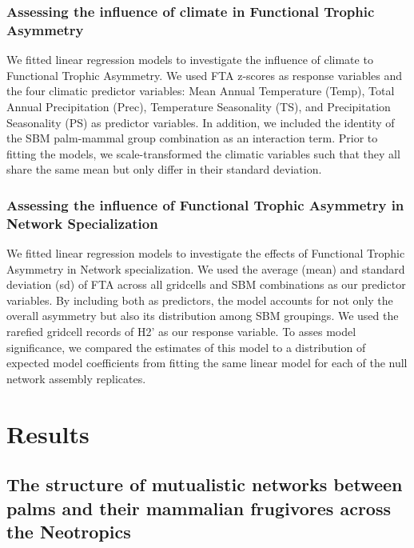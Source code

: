 \documentclass[
]{agujournal2019}
\begin{document}
\subsubsection{Assessing the influence of climate in Functional Trophic
Asymmetry}\label{assessing-the-influence-of-climate-in-functional-trophic-asymmetry}

We fitted linear regression models to investigate the influence of
climate to Functional Trophic Asymmetry. We used FTA z-scores as
response variables and the four climatic predictor variables: Mean
Annual Temperature (Temp), Total Annual Precipitation (Prec),
Temperature Seasonality (TS), and Precipitation Seasonality (PS) as
predictor variables. In addition, we included the identity of the SBM
palm-mammal group combination as an interaction term. Prior to fitting
the models, we scale-transformed the climatic variables such that they
all share the same mean but only differ in their standard deviation.

\subsubsection{Assessing the influence of Functional Trophic Asymmetry
in Network
Specialization}\label{assessing-the-influence-of-functional-trophic-asymmetry-in-network-specialization}

We fitted linear regression models to investigate the effects of
Functional Trophic Asymmetry in Network specialization. We used the
average (mean) and standard deviation (sd) of FTA across all gridcells
and SBM combinations as our predictor variables. By including both as
predictors, the model accounts for not only the overall asymmetry but
also its distribution among SBM groupings. We used the rarefied gridcell
records of H2' as our response variable. To asses model significance, we
compared the estimates of this model to a distribution of expected model
coefficients from fitting the same linear model for each of the null
network assembly replicates.

\section{Results}\label{results}

\subsection{The structure of mutualistic networks between palms and
their mammalian frugivores across the
Neotropics}\label{the-structure-of-mutualistic-networks-between-palms-and-their-mammalian-frugivores-across-the-neotropics}
\end{document}
